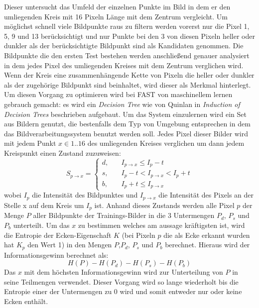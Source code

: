 Dieser untersucht das Umfeld der einzelnen Punkte im Bild in dem er den umliegenden Kreis mit 16 Pixeln Länge mit dem Zentrum vergleicht.
Um möglichst schnell viele Bildpunkte raus zu filtern werden vorerst nur die Pixel 1, 5, 9 und 13 berücksichtigt und nur Punkte bei den 3 von diesen Pixeln heller oder dunkler als der berücksichtigte Bildpunkt sind als Kandidaten genommen.
Die Bildpunkte die den ersten Test bestehen werden anschließend genauer analysiert in dem jedes Pixel des umliegenden Kreises mit dem Zentrum verglichen wird.
Wenn der Kreis eine zusammenhängende Kette von Pixeln die heller oder dunkler als der zugehörige Bildpunkt sind beinhaltet, wird dieser als Merkmal hinterlegt.
Um diesen Vorgang zu optimieren wird bei FAST von maschinellem lernen gebrauch gemacht: es wird ein \emph{Decision Tree} wie von Quinlan in \emph{Induction of Decision Trees} beschrieben aufgebaut.
Um das System einzulernen wird ein Set aus Bildern genutzt, die bestenfalls dem Typ von Umgebung entsprechen in dem das Bildverarbeitungssystem benutzt werden soll.
Jedes Pixel dieser Bilder wird mit jedem Punkt $ x \in {1..16} $ des umliegenden Kreises verglichen um dann jedem Kreispunkt einen Zustand zuzuweisen:
\begin{equation}
S_{p\rightarrow x}=
\begin{cases}
d, & \quad I_{p\rightarrow x}\leq I_p - t\\
s, & \quad I_p - t < I_{p\rightarrow x} < I_p + t\\
b, & \quad I_p + t \leq I_{p\rightarrow x}
\end{cases}
\end{equation}
wobei $I_p$ die Intensität des Bildpunktes und $I_{p\rightarrow x}$ die Intensität des Pixels an der Stelle x auf dem Kreis um $I_p$ ist.
Anhand dieses Zustands werden alle Pixel $p$ der Menge $P$ aller Bildpunkte der Trainings-Bilder in die 3 Untermengen $P_d$, $P_s$ und $P_b$ unterteilt.
Um das $x$ zu bestimmen welches am aussage kräftigsten ist, wird die Entropie der Ecken-Eigenschaft $K$ (bei Pixeln  $p$ die als Ecke erkannt wurden hat $K_p$ den Wert 1) in den Mengen $P$,$P_d$, $P_s$ und $P_b$ berechnet.
Hieraus wird der Informationsgewinn berechnet als:
\begin{equation}
H(P) - H(P_d) - H(P_s) - H(P_b)
\end{equation}
Das $x$ mit dem höchsten Informationsgewinn wird zur Unterteilung von $P$ in seine Teilmengen verwendet.
Dieser Vorgang wird so lange wiederholt bis die Entropie einer der Untermengen zu $0$ wird und somit entweder nur oder keine Ecken enthält.
